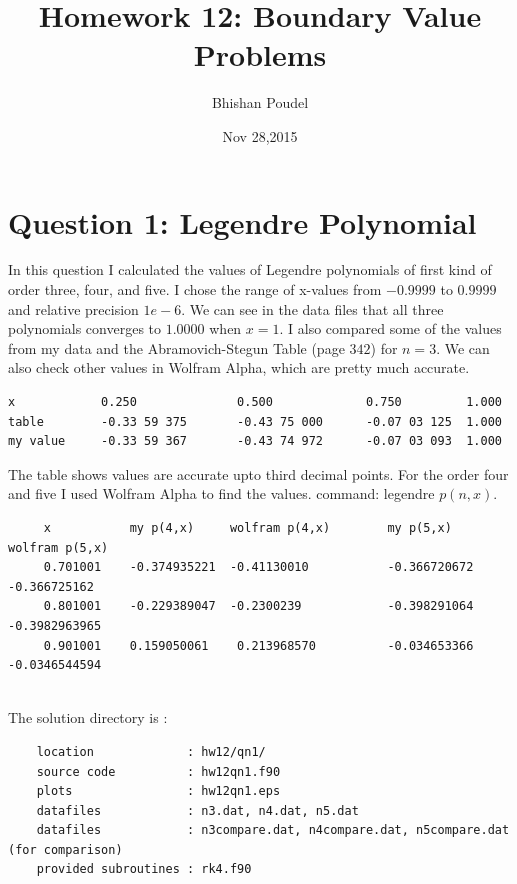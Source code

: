 \documentclass[11pt,a4paper,english]{article}
\title{Homework 12: Boundary Value Problems}
\author{Bhishan Poudel}
\date{Nov 28,2015}
\begin{document}
\maketitle
\tableofcontents
\listoffigures
\clearpage


\section{Question 1: Legendre Polynomial}
In this question I calculated the values of Legendre polynomials of first kind 
of order three, four, and five.
I chose the range of x-values from $-0.9999$ to $0.9999$ and relative precision
$1e-6$. We can see in the data files that all three polynomials converges to $1.0000$
when $x=1$.
I also compared some of the values from my data and the Abramovich-Stegun Table (page $342$) for $n=3$.
We can also check other values in Wolfram Alpha, which are pretty much accurate.

\begin{verbatim}
x            0.250              0.500             0.750         1.000
table        -0.33 59 375       -0.43 75 000      -0.07 03 125  1.000
my value     -0.33 59 367       -0.43 74 972      -0.07 03 093  1.000  
\end{verbatim}
The table shows values are accurate upto third decimal points.
For the order four and five I used Wolfram Alpha to find the values.
command: legendre $p(n,x)$.

\begin{verbatim}
     x           my p(4,x)     wolfram p(4,x)        my p(5,x)     wolfram p(5,x)
     0.701001    -0.374935221  -0.41130010           -0.366720672  -0.366725162    
     0.801001    -0.229389047  -0.2300239            -0.398291064  -0.3982963965
     0.901001    0.159050061    0.213968570          -0.034653366  -0.0346544594
             

\end{verbatim}

	The solution directory is :\\
	\begin{verbatim}
	location             : hw12/qn1/ 
	source code          : hw12qn1.f90
	plots                : hw12qn1.eps
	datafiles            : n3.dat, n4.dat, n5.dat
	datafiles            : n3compare.dat, n4compare.dat, n5compare.dat (for comparison)
	provided subroutines : rk4.f90 
	\end{verbatim}
	
\end{document}
